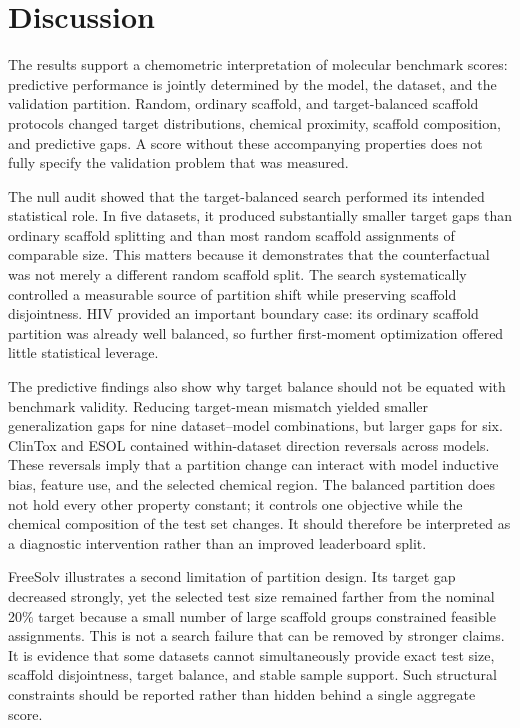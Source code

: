 \section{Discussion}

The results support a chemometric interpretation of molecular benchmark scores: predictive performance is jointly determined by the model, the dataset, and the validation partition. Random, ordinary scaffold, and target-balanced scaffold protocols changed target distributions, chemical proximity, scaffold composition, and predictive gaps. A score without these accompanying properties does not fully specify the validation problem that was measured.

The null audit showed that the target-balanced search performed its intended statistical role. In five datasets, it produced substantially smaller target gaps than ordinary scaffold splitting and than most random scaffold assignments of comparable size. This matters because it demonstrates that the counterfactual was not merely a different random scaffold split. The search systematically controlled a measurable source of partition shift while preserving scaffold disjointness. HIV provided an important boundary case: its ordinary scaffold partition was already well balanced, so further first-moment optimization offered little statistical leverage.

The predictive findings also show why target balance should not be equated with benchmark validity. Reducing target-mean mismatch yielded smaller generalization gaps for nine dataset--model combinations, but larger gaps for six. ClinTox and ESOL contained within-dataset direction reversals across models. These reversals imply that a partition change can interact with model inductive bias, feature use, and the selected chemical region. The balanced partition does not hold every other property constant; it controls one objective while the chemical composition of the test set changes. It should therefore be interpreted as a diagnostic intervention rather than an improved leaderboard split.

FreeSolv illustrates a second limitation of partition design. Its target gap decreased strongly, yet the selected test size remained farther from the nominal 20\% target because a small number of large scaffold groups constrained feasible assignments. This is not a search failure that can be removed by stronger claims. It is evidence that some datasets cannot simultaneously provide exact test size, scaffold disjointness, target balance, and stable sample support. Such structural constraints should be reported rather than hidden behind a single aggregate score.

